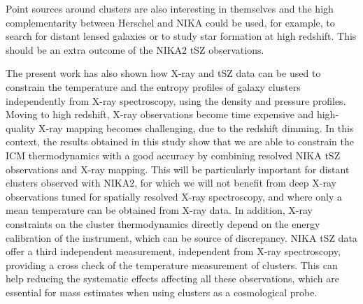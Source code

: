 \documentclass[twocolumn,traditabstract]{aa}
\begin{document}
Point sources around clusters are also interesting in themselves and the high complementarity between Herschel and NIKA could be used, for example, to search for distant lensed galaxies \citep[see for example][]{egami2010} or to study star formation at high redshift. This should be an extra outcome of the NIKA2 tSZ observations.

The present work has also shown how X-ray and tSZ data can be used to constrain the temperature and the entropy profiles of galaxy clusters independently from X-ray spectroscopy, using the density and pressure profiles. Moving to high redshift, X-ray observations become time expensive and high-quality X-ray mapping becomes challenging, due to the redshift dimming. In this context, the results obtained in this study show that we are able to constrain the ICM thermodynamics with a good accuracy by combining resolved NIKA tSZ observations and X-ray mapping. This will be particularly important for distant clusters observed with NIKA2, for which we will not benefit from deep X-ray observations tuned for spatially resolved X-ray spectroscopy, and where only a mean temperature can be obtained from X-ray data. In addition, X-ray constraints on the cluster thermodynamics directly depend on the energy calibration of the instrument, which can be source of discrepancy. NIKA tSZ data offer a third independent measurement, independent from X-ray spectroscopy, providing a cross check of the temperature measurement of clusters. This can help reducing the systematic effects affecting all these observations, which are essential for mass estimates when using clusters as a cosmological probe.
\end{document}
